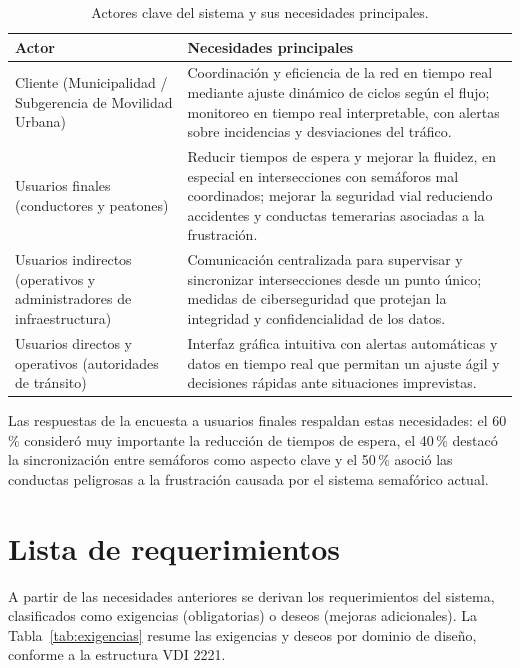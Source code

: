 \begin{table}[H]
  \centering
  \caption{Actores clave del sistema y sus necesidades principales.}
  \label{tab:actores}
  \begin{tabularx}{\linewidth}{@{}>{\raggedright\arraybackslash}p{4.3cm}>{\raggedright\arraybackslash}X@{}}
    \toprule
    \textbf{Actor} & \textbf{Necesidades principales}\\
    \midrule
    Cliente (Municipalidad / Subgerencia de Movilidad Urbana) &
    Coordinación y eficiencia de la red en tiempo real mediante ajuste dinámico de ciclos según el flujo;
    monitoreo en tiempo real interpretable, con alertas sobre incidencias y desviaciones del tráfico.\\
    Usuarios finales (conductores y peatones) &
    Reducir tiempos de espera y mejorar la fluidez, en especial en intersecciones con semáforos mal
    coordinados; mejorar la seguridad vial reduciendo accidentes y conductas temerarias asociadas a la
    frustración.\\
    Usuarios indirectos (operativos y administradores de infraestructura) &
    Comunicación centralizada para supervisar y sincronizar intersecciones desde un punto único; medidas de
    ciberseguridad que protejan la integridad y confidencialidad de los datos.\\
    Usuarios directos y operativos (autoridades de tránsito) &
    Interfaz gráfica intuitiva con alertas automáticas y datos en tiempo real que permitan un ajuste ágil y
    decisiones rápidas ante situaciones imprevistas.\\
    \bottomrule
  \end{tabularx}
\end{table}

Las respuestas de la encuesta a usuarios finales respaldan estas necesidades: el 60\,\% consideró muy
importante la reducción de tiempos de espera, el 40\,\% destacó la sincronización entre semáforos como aspecto
clave y el 50\,\% asoció las conductas peligrosas a la frustración causada por el sistema semafórico actual.

\section{Lista de requerimientos}\label{sec:requerimientos}

A partir de las necesidades anteriores se derivan los requerimientos del sistema, clasificados como exigencias
(obligatorias) o deseos (mejoras adicionales). La Tabla~\ref{tab:exigencias} resume las exigencias y deseos
por dominio de diseño, conforme a la estructura VDI 2221.


